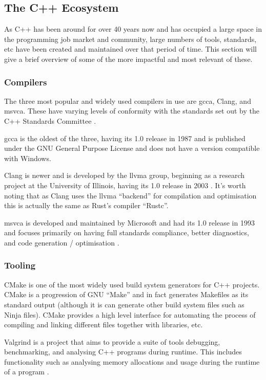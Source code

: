 \documentclass[a4paper]{article}
\begin{document}
\subsection{The C++ Ecosystem}
As C++ has been around for over 40 years now and has occupied a large space in the programming job market and community, large numbers of tools, standards, etc have been created and maintained over that period of time. This section will give a brief overview of some of the more impactful and most relevant of these.

\subsubsection{Compilers}
The three most popular and widely used compilers in use are \gls{gcca}, Clang, and \gls{msvca}. These have varying levels of conformity with the standards set out by the C++ Standards Committee \parencite{cpp-standard-conformity}.

\gls{gcca} is the oldest of the three, having its 1.0 release in 1987 \parencite{gcc-release} and is published under the GNU General Purpose License and does not have a version compatible with Windows.

Clang is newer and is developed by the \gls{llvma} group, beginning as a research project at the University of Illinois, having its 1.0 release in 2003 \parencite{what-is-llvm}. It's worth noting that as Clang uses the \gls{llvma} ``backend'' for compilation and optimisation this is actually the same as Rust's compiler ``Rustc''.

\gls{msvca} is developed and maintained by Microsoft and had its 1.0 release in 1993 \parencite{msvc-release} and focuses primarily on having full standards compliance, better diagnostics, and code generation / optimisation \parencite{msvc}.

\subsubsection{Tooling}
CMake is one of the most widely used build system generators for C++ projects. CMake is a progression of GNU ``Make'' and in fact generates Makefiles as its standard output (although it is can generate other build system files such as Ninja files). CMake provides a high level interface for automating the process of compiling and linking different files together with libraries, etc.

Valgrind is a project that aims to provide a suite of tools debugging, benchmarking, and analysing C++ programs during runtime. This includes functionality such as analysing memory allocations and usage during the runtime of a program \parencite{valgrind}.
\end{document}
